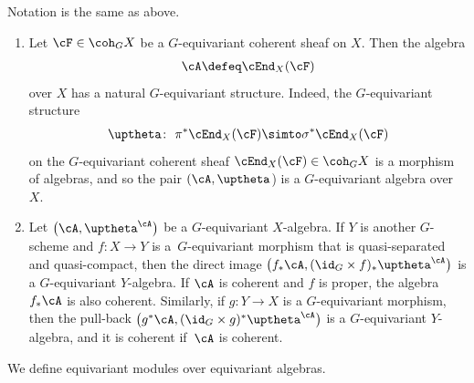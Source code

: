 \begin{exa}\label{end ex}
Notation is the same as above.
\begin{enumerate}\itemsep=0pt
\item Let $\cF\in \coh_GX$ be a $G$-equivariant coherent sheaf on $X$. Then the algebra
\begin{gather*}
\cA\defeq\cEnd_X(\cF)
\end{gather*}
over $X$ has a natural $G$-equivariant structure. Indeed, the $G$-equivariant structure
\begin{gather*}
\uptheta\colon\ \pi^*\cEnd_X(\cF)\simto \sigma^*\cEnd_X(\cF)
\end{gather*}
on the $G$-equivariant coherent sheaf $\cEnd_X(\cF)\in\coh_GX$
is a morphism of algebras, and so the pair $(\cA, \uptheta$) is a $G$-equivariant algebra over $X$.


\item Let $\big(\cA,\uptheta^{\cA}\big)$ be a $G$-equivariant $X$-algebra. If $Y$ is another $G$-scheme and $f\colon X\to Y$ is a~$G$-equ\-i\-variant morphism that is quasi-separated and quasi-compact,
then the direct image
$\big(f_*\cA,(\id_G\times f)_*\uptheta^{\cA}\big)$
is a $G$-equivariant $Y$-algebra. If $\cA$ is coherent and $f$ is proper, the algebra $f_*\cA$ is also coherent. Similarly, if $g\colon Y\to X$ is a $G$-equivariant morphism, then the pull-back $\big(g^*\cA,(\id_G\times g)^*\uptheta^{\cA}\big)$ is a $G$-equivariant $Y$-algebra, and it is coherent if~$\cA$ is coherent.
 \end{enumerate}
\end{exa}



We define equivariant modules over equivariant algebras.

